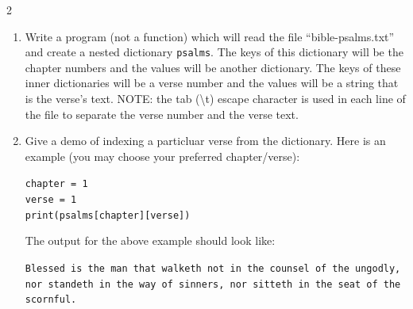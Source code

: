 \documentclass[12pt]{article}%
\newcommand{\code}[1]{\texttt{#1}}
\begin{document}
\begin{multicols*}{2}
\begin{Exercise}[origin={10 points, Python}]
\end{Exercise}

\vfill\null
\columnbreak

\begin{Exercise}[origin={10 points, Python}]

\begin{enumerate}[leftmargin=*]
	\item Write a program (not a function) which will  read the file ``bible-psalms.txt'' and create a nested dictionary \code{psalms}. The keys of this dictionary will be the chapter numbers and the values will be another dictionary. The keys of these inner dictionaries will be a verse number and the values will be a string that is the verse's text. NOTE: the tab (\textbackslash  t) escape character is used in each line of the file to separate the verse number and the verse text.
	\item Give a demo of indexing a particluar verse from the dictionary. Here is an example (you may choose your preferred chapter/verse):
	
	\code{chapter = 1 \\
	verse = 1 \\
	print(psalms[chapter][verse])
	}
	
	The output for the above example should look like:
	
	\code{Blessed is the man that walketh not in the counsel of the ungodly, nor standeth in the way of sinners, nor sitteth in the seat of the scornful.
	}	
\end{enumerate}

\end{Exercise}

\vfill\null
\end{multicols*}
\end{document}
